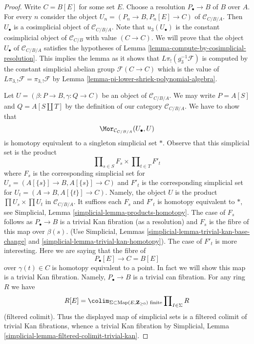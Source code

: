 \begin{proof}
Write $C = B[E]$ for some set $E$. Choose a resolution
$P_\bullet \to B$ of $B$ over $A$. For every $n$ consider
the object $U_n = (P_n \to B, P_n[E] \to C)$ of $\mathcal{C}_{C/B/A}$.
Then $U_\bullet$ is a cosimplicial object of $\mathcal{C}_{C/B/A}$.
Note that $u_3(U_\bullet)$ is the constant cosimplicial
object of $\mathcal{C}_{C/B}$ with value $(C \to C)$.
We will prove that the object $U_\bullet$ of $\mathcal{C}_{C/B/A}$
satisfies the hypotheses of
Lemma \ref{lemma-compute-by-cosimplicial-resolution}.
This implies the lemma as it shows that $L\pi_!(g_3^{-1}\mathcal{F})$
is computed by the constant simplicial abelian group
$\mathcal{F}(C \to C)$ which is the value of
$L\pi_{3, !}\mathcal{F} = \pi_{3, !}\mathcal{F}$ by
Lemma \ref{lemma-pi-lower-shriek-polynomial-algebra}.

\medskip\noindent
Let $U = (\beta : P \to B, \gamma : Q \to C)$ be an object of
$\mathcal{C}_{C/B/A}$. We may write $P = A[S]$ and $Q = A[S \amalg T]$
by the definition of our category $\mathcal{C}_{C/B/A}$. We have to show that
$$
\Mor_{\mathcal{C}_{C/B/A}}(U_\bullet, U)
$$
is homotopy equivalent to a singleton simplicial set $*$. Observe that this
simplicial set is the product
$$
\prod\nolimits_{s \in S} F_s \times \prod\nolimits_{t \in T} F'_t
$$
where $F_s$ is the corresponding simplicial set for
$U_s = (A[\{s\}] \to B, A[\{s\}] \to C)$
and $F'_t$ is the corresponding simplicial set for
$U_t = (A \to B, A[\{t\}] \to C)$. Namely, the object $U$
is the product $\prod U_s \times \prod U_t$ in $\mathcal{C}_{C/B/A}$.
It suffices each $F_s$ and $F'_t$ is homotopy equivalent to $*$, see
Simplicial, Lemma \ref{simplicial-lemma-products-homotopy}.
The case of $F_s$ follows as $P_\bullet \to B$ is a trivial Kan
fibration (as a resolution) and $F_s$ is the fibre of this map over
$\beta(s)$. (Use Simplicial, Lemmas
\ref{simplicial-lemma-trivial-kan-base-change} and
\ref{simplicial-lemma-trivial-kan-homotopy}).
The case of $F'_t$ is more interesting. Here we are saying that
the fibre of
$$
P_\bullet[E] \longrightarrow C = B[E]
$$
over $\gamma(t) \in C$ is homotopy equivalent to a point. In fact we
will show this map is a trivial Kan fibration. Namely,
$P_\bullet \to B$ is a trivial can fibration. For any ring $R$
we have
$$
R[E] =
\colim_{\Sigma \subset \text{Map}(E, \mathbf{Z}_{\geq 0})\text{ finite}}
\prod\nolimits_{I \in \Sigma} R
$$
(filtered colimit). Thus the displayed map of simplicial sets is a
filtered colimit of trivial Kan fibrations, whence a trivial Kan fibration
by Simplicial, Lemma \ref{simplicial-lemma-filtered-colimit-trivial-kan}.
\end{proof}

